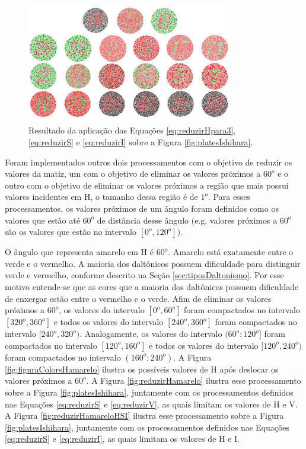 \documentclass[	12pt, Times, openright, twoside, a4paper, english, brazil]{abntex2}
\begin{document}
\begin{figure}[!htb]
\centering \includegraphics[width=0.80\textwidth]{figuraDeslocarHSeI.jpg}
\caption{Resultado da aplicação das Equações \ref{eq:reduzirHpara3}, \ref{eq:reduzirS} e \ref{eq:reduzirI} sobre a Figura \ref{fig:platesIshihara}. \label{fig:reduzirHSeI}}
\end{figure}


Foram implementados outros dois processamentos com o objetivo de reduzir os valores da matiz, um com o objetivo de eliminar os valores próximos a $60^o$ e o outro com o objetivo de eliminar os valores próximos a região que mais possui valores incidentes em H, o tamanho dessa região é de $1^o$. Para esses processamentos, os valores próximos de um ângulo foram definidos como os valores que estão até $60^o$ de distância desse ângulo (e.g. valores próximos a $60^o$ são os valores que estão no intervalo $[0^o,120^o]$).

O ângulo que representa amarelo em H é $60^o$. Amarelo está exatamente entre o verde e o vermelho. A maioria dos daltônicos possuem dificuldade para distinguir verde e vermelho, conforme descrito na Seção \ref{sec:tiposDaltonismo}. Por esse motivo entende-se que as cores que a maioria dos daltônicos possuem dificuldade de enxergar estão entre o vermelho e o verde. Afim de eliminar os valores próximos a $60^o$, os valores do intervalo $[0^o,60^o]$ foram compactados no intervalo $[320^o,360^o]$ e todos os valores do intervalo $[240^o,360^o]$ foram compactados no intervalo $[240^o,320^o)$. Analogamente, os valores do intervalo $(60^o;120^o]$ foram compactados no intervalo $[120^o,160^o]$ e todos os valores do intervalo $[120^o,240^o)$ foram compactados no intervalo $(160^o;240^o)$. A Figura \ref{fig:figuraColorsHamarelo} ilustra os possíveis valores de H após deslocar os valores próximos a $60^o$. A Figura \ref{fig:reduzirHamarelo} ilustra esse processamento sobre a Figura \ref{fig:platesIshihara}, juntamente com os processamentos definidos nas Equações \ref{eq:reduzirS} e \ref{eq:reduzirV}, as quais limitam os valores de H e V. A Figura \ref{fig:reduzirHamareloHSI} ilustra esse processamento sobre a Figura \ref{fig:platesIshihara}, juntamente com os processamentos definidos nas Equações \ref{eq:reduzirS} e \ref{eq:reduzirI}, as quais limitam os valores de H e I.
\end{document}
